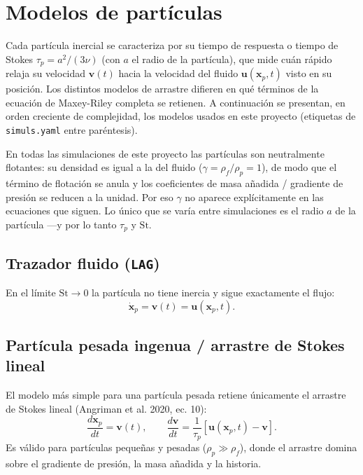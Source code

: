 \documentclass[11pt]{article}
\begin{document}
\section{Modelos de partículas}
\label{sec:particulas}

Cada partícula inercial se caracteriza por su tiempo de respuesta o tiempo
de Stokes $\tau_p = a^2/(3\nu)$ (con $a$ el radio de la partícula), que
mide cuán rápido relaja su velocidad $\mathbf{v}(t)$ hacia la velocidad
del fluido $\mathbf{u}(\mathbf{x}_p,t)$ visto en su posición. Los distintos
modelos de arrastre difieren en qué términos de la ecuación de
Maxey-Riley completa se retienen. A continuación se presentan, en orden
creciente de complejidad, los modelos usados en este proyecto (etiquetas
de \texttt{simuls.yaml} entre paréntesis).

En todas las simulaciones de este proyecto las partículas son
neutralmente flotantes: su densidad es igual a la del fluido
($\gamma = \rho_f/\rho_p = 1$), de modo que el término de flotación se
anula y los coeficientes de masa añadida / gradiente de presión se
reducen a la unidad. Por eso $\gamma$ no aparece explícitamente en las
ecuaciones que siguen. Lo único que se varía entre simulaciones es el
radio $a$ de la partícula —y por lo tanto $\tau_p$ y $\mathrm{St}$.

\subsection{Trazador fluido (\texttt{LAG})}

En el límite $\mathrm{St}\to 0$ la partícula no tiene inercia y sigue
exactamente el flujo:
\begin{equation}
  \dot{\mathbf{x}}_p = \mathbf{v}(t) = \mathbf{u}(\mathbf{x}_p,t).
\end{equation}

\subsection{Partícula pesada ingenua / arrastre de Stokes lineal}

El modelo más simple para una partícula pesada retiene únicamente el
arrastre de Stokes lineal (Angriman et al. 2020, ec. 10):
\begin{equation}
  \frac{d\mathbf{x}_p}{dt} = \mathbf{v}(t), \qquad
  \frac{d\mathbf{v}}{dt} = \frac{1}{\tau_p}\left[\mathbf{u}(\mathbf{x}_p,t) - \mathbf{v}\right].
\end{equation}
Es válido para partículas pequeñas y pesadas ($\rho_p \gg \rho_f$), donde
el arrastre domina sobre el gradiente de presión, la masa añadida y la
historia.
\end{document}
